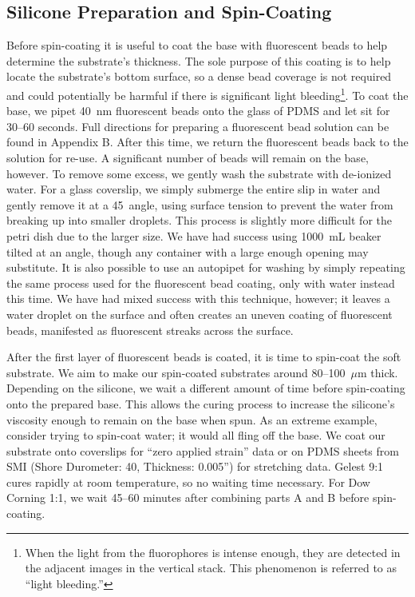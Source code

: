 \subsection{Silicone Preparation and Spin-Coating}
Before spin-coating it is useful to coat the base with fluorescent beads to help determine the substrate's thickness. The sole purpose of this coating is to help locate the substrate's bottom surface, so a dense bead coverage is not required and could potentially be harmful if there is significant light bleeding\footnote{When the light from the fluorophores is intense enough, they are detected in the adjacent images in the vertical stack. This phenomenon is referred to as ``light bleeding.''}. To coat the base, we pipet 40~nm fluorescent beads onto the glass of PDMS and let sit for 30--60 seconds. Full directions for preparing a fluorescent bead solution can be found in Appendix B. After this time, we return the fluorescent beads back to the solution for re-use. A significant number of beads will remain on the base, however. To remove some excess, we gently wash the substrate with de-ionized water. For a glass coverslip, we simply submerge the entire slip in water and gently remove it at a 45\degree ~angle, using surface tension to prevent the water from breaking up into smaller droplets. This process is slightly more difficult for the petri dish due to the larger size. We have had success using 1000~mL beaker tilted at an angle, though any container with a large enough opening may substitute. It is also possible to use an autopipet for washing by simply repeating the same process used for the fluorescent bead coating, only with water instead this time. We have had mixed success with this technique, however; it leaves a water droplet on the surface and often creates an uneven coating of fluorescent beads, manifested as fluorescent streaks across the surface.

After the first layer of fluorescent beads is coated, it is time to spin-coat the soft substrate. We aim to make our spin-coated substrates around  80--100~$\mu$m thick. Depending on the silicone, we wait a different amount of time before spin-coating onto the prepared base. This allows the curing process to increase the silicone's viscosity enough to remain on the base when spun. As an extreme example, consider trying to spin-coat water; it would all fling off the base. We coat our substrate onto coverslips for ``zero applied strain'' data or on PDMS sheets from SMI (Shore Durometer: 40, Thickness: 0.005'') for stretching data. Gelest 9:1 cures rapidly at room temperature, so no waiting time necessary. For Dow Corning 1:1, we wait 45--60 minutes after combining parts A and B before spin-coating.

